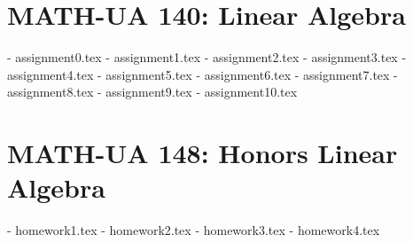 \section{MATH-UA 140: Linear Algebra}
- assignment0.tex
- assignment1.tex
- assignment2.tex
- assignment3.tex
- assignment4.tex
- assignment5.tex
- assignment6.tex
- assignment7.tex
- assignment8.tex
- assignment9.tex
- assignment10.tex

\section{MATH-UA 148: Honors Linear Algebra}
- homework1.tex
- homework2.tex
- homework3.tex
- homework4.tex


